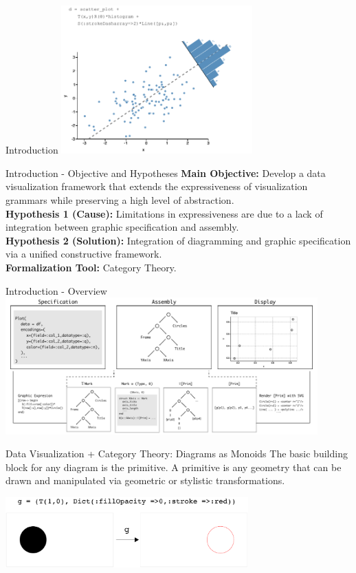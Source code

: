 \documentclass[aspectratio=169,xcolor=dvipsnames,10pt]{beamer}
\theoremstyle{definition}
\begin{document}
\begin{frame}{Introduction}
    \centering
    \includegraphics[width=0.55\textwidth]{./figs/pca.pdf}
\end{frame}

\begin{frame}{Introduction - Objective and Hypotheses}
    \textbf{Main Objective:} Develop a data visualization framework that extends the expressiveness of visualization grammars while preserving a high level of abstraction.
    \\[1em]
    \textbf{Hypothesis 1 (Cause):} Limitations in expressiveness are due to a lack of integration between graphic specification and assembly.
    \\[1em]
    \textbf{Hypothesis 2 (Solution):} Integration of diagramming and graphic specification via a unified constructive framework.
    \\[1em]
    \textbf{Formalization Tool:} Category Theory.
\end{frame}

\begin{frame}{Introduction - Overview}
    \centering
    \includegraphics[width=0.9\textwidth]{figs/pipe.pdf}
\end{frame}

\begin{frame}{Data Visualization + Category Theory: Diagrams as Monoids}
    The basic building block for any diagram is the primitive.
    A primitive is any geometry that can be drawn and manipulated via geometric or stylistic transformations.
    \\[1em]
    \begin{center}
    \includegraphics[width=0.7\textwidth]{figs/primitivetransformation.pdf}
    \end{center}
\end{frame}
\end{document}
